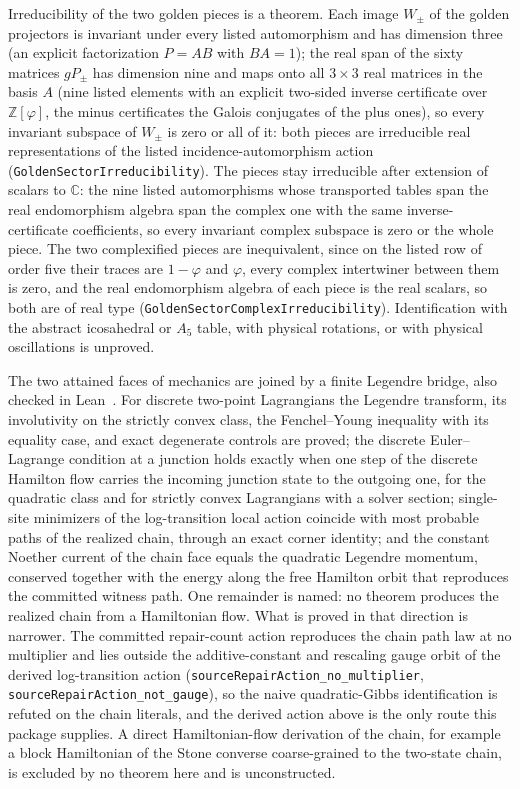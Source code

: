 \documentclass[11pt]{article}
\begin{document}
Irreducibility of the two golden pieces is a theorem. Each image
\(W_\pm\) of the golden projectors is invariant under every listed
automorphism and has dimension three (an explicit factorization
\(P=AB\) with \(BA=1\)); the real span of the sixty matrices \(gP_\pm\) has
dimension nine and maps onto all \(3\times3\) real matrices in the basis
\(A\) (nine listed elements with an explicit two-sided inverse certificate
over \(\mathbb Z[\varphi]\), the minus certificates the Galois conjugates of
the plus ones), so every invariant subspace of \(W_\pm\) is zero or all of
it: both pieces are irreducible real representations of the listed
incidence-automorphism action
(\texttt{GoldenSectorIrreducibility}). The pieces stay
irreducible after extension of scalars to \(\mathbb C\): the nine listed
automorphisms whose transported tables span the real endomorphism algebra
span the complex one with the same inverse-certificate coefficients, so
every invariant complex subspace is zero or the whole piece. The two
complexified pieces are inequivalent, since on the listed row of order five
their traces are \(1-\varphi\) and \(\varphi\), every complex intertwiner
between them is zero, and the real endomorphism algebra of each piece is the
real scalars, so both are of real type
(\texttt{GoldenSectorComplexIrreducibility}). Identification
with the abstract icosahedral or \(A_5\) table, with physical rotations, or
with physical oscillations is unproved.

The two attained faces of mechanics are joined by a finite Legendre bridge,
also checked in Lean~\cite{ophrepo}.  For discrete two-point Lagrangians the
Legendre transform, its involutivity on the strictly convex class, the
Fenchel--Young inequality with its equality case, and exact degenerate
controls are proved; the discrete Euler--Lagrange condition at a junction
holds exactly when one step of the discrete Hamilton flow carries the
incoming junction state to the outgoing one, for the quadratic class and for
strictly convex Lagrangians with a solver section; single-site minimizers of
the log-transition local action coincide with most probable paths of the
realized chain, through an exact corner identity; and the constant Noether
current of the chain face equals the quadratic Legendre momentum, conserved
together with the energy along the free Hamilton orbit that reproduces the
committed witness path.  One remainder is named: no theorem produces the
realized chain from a Hamiltonian flow.  What is proved in that direction
is narrower.  The committed repair-count action reproduces the chain path
law at no multiplier and lies outside the additive-constant and rescaling
gauge orbit of the derived log-transition action
(\texttt{sourceRepairAction\_no\_multiplier},
\texttt{sourceRepairAction\_not\_gauge}), so the naive quadratic-Gibbs
identification is refuted on the chain literals, and the derived action
above is the only route this package supplies.  A direct Hamiltonian-flow
derivation of the chain, for example a block Hamiltonian of the Stone
converse coarse-grained to the two-state chain, is excluded by no theorem
here and is unconstructed.
\end{document}
